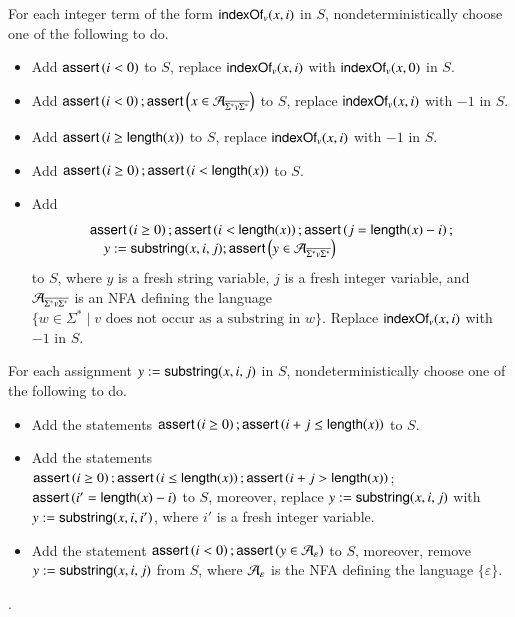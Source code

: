 For each integer term of the form $\mathsf{indexOf}_v(x,i)$ in $S$, nondeterministically choose one of the following to do.
\begin{itemize}
\item Add $\textsf{assert}\left(i < 0\right)$ to $S$, replace $\mathsf{indexOf}_v(x,i)$ with $\mathsf{indexOf}_v(x,0)$ in $S$. 
%
\item Add $\textsf{assert}\left(i < 0\right);\textsf{assert}\left(x \in \mathcal{A}_{\overline{\Sigma^*v\Sigma^*}}\right)$ to $S$, replace $\mathsf{indexOf}_v(x,i)$ with $-1$ in $S$.
%
\item Add $\textsf{assert}\left(i \ge \mathsf{length}(x)\right)$ to $S$, replace $\mathsf{indexOf}_v(x,i)$ with $-1$ in $S$.
%
\item Add $\textsf{assert}\left(i \ge 0\right); \textsf{assert}\left(i < \mathsf{length}(x)\right)$ to $S$.
%
\item Add 
%
$$
\begin{array}{l}
\textsf{assert}\left(i \ge 0\right); \textsf{assert}\left(i < \mathsf{length}(x)\right); \textsf{assert}\left(j=\mathsf{length}(x)-i\right); \\
\ \ \ \ y:=\mathsf{substring}(x, i, j); \textsf{assert}\left(y \in \mathcal{A}_{\overline{\Sigma^*v\Sigma^*}}\right)
\end{array}
$$ 
to $S$, where $y$ is a fresh string variable, $j$ is a fresh integer variable, and $\mathcal{A}_{\overline{\Sigma^*v\Sigma^*}}$ is an NFA defining the language $\{w \in \Sigma^*\mid v \mbox{ does not occur as a substring in } w\}$. Replace $\mathsf{indexOf}_v(x, i)$ with $-1$ in $S$.
\end{itemize}

%
For each assignment $y:=\mathsf{substring}(x, i, j)$ in $S$, nondeterministically choose one of the following to do.
\begin{itemize}
\item Add the statements $\textsf{assert}\left(i \ge 0\right); \textsf{assert}\left(i + j \le \mathsf{length}(x)\right)$ to $S$. 
%
\item Add the statements 
$\textsf{assert}\left(i \ge 0\right); \textsf{assert}\left(i \le \mathsf{length}(x)\right);\textsf{assert}\left(i+j  > \mathsf{length}(x)\right)$; $\textsf{assert}\left(i'  = \mathsf{length}(x)-i\right)$
to $S$, moreover, replace $y:=\mathsf{substring}(x, i, j)$ with $y:=\mathsf{substring}(x, i, i')$, where $i'$ is a fresh integer variable.
%
\item Add the statement $\textsf{assert}\left(i < 0\right); \textsf{assert}\left(y \in \mathcal{A}_\varepsilon\right)$ to $S$, moreover, remove $y:=\mathsf{substring}(x, i, j)$ from $S$, where $\mathcal{A}_\varepsilon$ is the NFA defining the language $\{\varepsilon\}$.
\end{itemize}




\medskip
{}.

